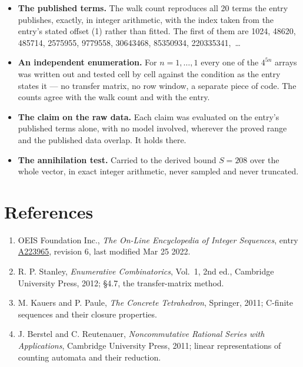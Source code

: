 \documentclass[11pt]{article}
\theoremstyle{definition}
\begin{document}
\begin{itemize}

\item {\bfseries The published terms.} The walk count reproduces all 20 terms the entry publishes, exactly, in integer arithmetic, with the index taken from the entry's stated offset (1) rather than fitted. The first of them are 1024, 48620, 485714, 2575955, 9779558, 30643468, 85350934, 220335341,~\dots

\item {\bfseries An independent enumeration.} For $n = 1,\dots,1$ every one of the $4^{5n}$ arrays was written out and tested cell by cell against the condition as the entry states it --- no transfer matrix, no row window, a separate piece of code. The counts agree with the walk count and with the entry.

\item {\bfseries The claim on the raw data.} Each claim was evaluated on the entry's published terms alone, with no model involved, wherever the proved range and the published data overlap. It holds there.

\item {\bfseries The annihilation test.} Carried to the derived bound $S = 208$ over the whole vector, in exact integer arithmetic, never sampled and never truncated.

\end{itemize}

\section{References}

\begin{enumerate}

\item OEIS Foundation Inc., \emph{The On-Line Encyclopedia of Integer Sequences}, entry \href{https://oeis.org/A223965}{A223965}, revision 6, last modified Mar 25 2022.

\item R. P. Stanley, \emph{Enumerative Combinatorics}, Vol.~1, 2nd ed., Cambridge University Press, 2012; \S4.7, the transfer-matrix method.

\item M. Kauers and P. Paule, \emph{The Concrete Tetrahedron}, Springer, 2011; C-finite sequences and their closure properties.

\item J. Berstel and C. Reutenauer, \emph{Noncommutative Rational Series with Applications}, Cambridge University Press, 2011; linear representations of counting automata and their reduction.

\end{enumerate}
\end{document}
